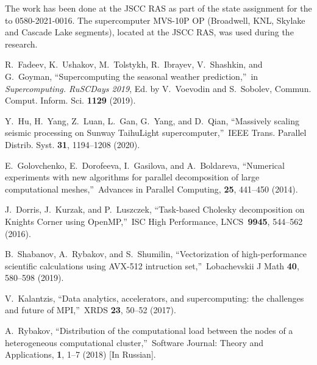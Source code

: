 \documentclass[
11pt,%
tightenlines,%
twoside,%
onecolumn,%
nofloats,%
nobibnotes,%
nofootinbib,%
superscriptaddress,%
noshowpacs,%
centertags]%
{revtex4}
\begin{document}
\begin{acknowledgments}
The work has been done at the JSCC RAS as part of the state assignment for the to 0580-2021-0016.
The supercomputer MVS-10P OP (Broadwell, KNL, Skylake and Cascade Lake segments), located at the JSCC RAS, was used during the research.
\end{acknowledgments}

\begin{thebibliography}{99}


R.~Fadeev, K.~Ushakov, M.~Tolstykh, R.~Ibrayev, V.~Shashkin, and G.~Goyman, \textquotedblleft Supercomputing the seasonal weather prediction,\textquotedblright \ in \textit{Supercomputing. RuSCDays 2019}, Ed. by V.~Voevodin and S.~Sobolev, Commun. Comput. Inform. Sci. \textbf{1129} (2019).

Y.~Hu, H.~Yang, Z.~Luan, L.~Gan, G.~Yang, and D.~Qian, \textquotedblleft Massively scaling seismic processing on Sunway TaihuLight supercomputer,\textquotedblright \ IEEE Trans. Parallel Distrib. Syst. \textbf{31}, 1194--1208 (2020).

E.~Golovchenko, E.~Dorofeeva, I.~Gasilova, and A.~Boldareva, \textquotedblleft Numerical experiments with new algorithms for parallel decomposition of large computational meshes,\textquotedblright \ Advances in Parallel Computing, \textbf{25}, 441--450 (2014).

J.~Dorris, J.~Kurzak, and P.~Luszczek, \textquotedblleft Task-based Cholesky decomposition on Knights Corner using OpenMP,\textquotedblright \ ISC High Performance, LNCS~\textbf{9945}, 544--562 (2016).

B.~Shabanov, A.~Rybakov, and S.~Shumilin, \textquotedblleft Vectorization of high-performance scientific calculations using AVX-512 intruction set,\textquotedblright \ Lobachevskii J Math {\bf 40}, 580--598 (2019).

V.~Kalantzis, \textquotedblleft Data analytics, accelerators, and supercomputing: the challenges and future of MPI,\textquotedblright \ XRDS {\bf 23}, 50--52 (2017).

A.~Rybakov, \textquotedblleft Distribution of the computational load between the nodes of a heterogeneous computational cluster,\textquotedblright \ Software Journal:
Theory and Applications, \textbf{1}, 1--7 (2018) [In Russian].


\end{thebibliography}
\end{document}
